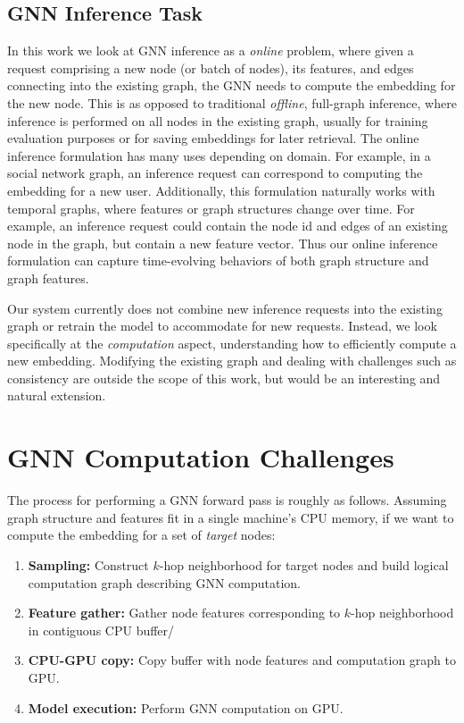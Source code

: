 \subsection{GNN Inference Task}
In this work we look at GNN inference as a \textit{online} problem, where given a request comprising a new node (or batch of nodes), its features, and edges connecting into the existing graph, the GNN needs to compute the embedding for the new node. 
This is as opposed to traditional \textit{offline}, full-graph inference, where inference is performed on all nodes in the existing graph, usually for training evaluation purposes or for saving embeddings for later retrieval. 
The online inference formulation has many uses depending on domain. 
For example, in a social network graph, an inference request can correspond to computing the embedding for a new user. 
Additionally, this formulation naturally works with temporal graphs, where features or graph structures change over time. 
For example, an inference request could contain the node id and edges of an existing node in the graph, but contain a new feature vector. 
Thus our online inference formulation can capture time-evolving behaviors of both graph structure and graph features.

Our system currently does not combine new inference requests into the existing graph or retrain the model to accommodate for new requests. 
Instead, we look specifically at the \textit{computation} aspect, understanding how to efficiently compute a new embedding. 
Modifying the existing graph and dealing with challenges such as consistency are outside the scope of this work, but would be an interesting and natural extension.

\section{GNN Computation Challenges}
 
The process for performing a GNN forward pass is roughly as follows. Assuming graph structure and  features fit in a single machine's CPU memory, if we want to compute the embedding for a set of \textit{target} nodes:

\begin{enumerate}
    \item \textbf{Sampling:} Construct $k$-hop neighborhood for target nodes and build logical computation graph describing GNN computation.
    \item \textbf{Feature gather:} Gather node features corresponding to $k$-hop neighborhood in contiguous CPU buffer/
    \item \textbf{CPU-GPU copy:} Copy buffer with node features and computation graph to GPU.
    \item \textbf{Model execution:} Perform GNN computation on GPU.
\end{enumerate}

